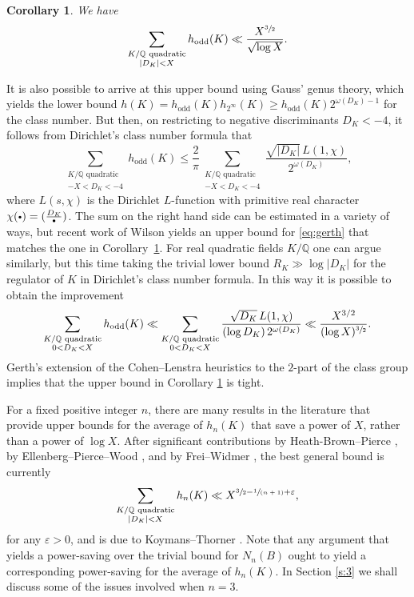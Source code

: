 \documentclass[JEP,XML,SOM,Unicode]{cedram}
\newcommand{\spfrac}[2]{\sfrac{#1}{(#2)}}
\newcommand{\cbullet}{{\raisebox{1pt}{$\scriptscriptstyle\bullet$}}}
\newcommand{\QQ}{\mathbb{Q}}\let\Q\QQ
\let\ve\varepsilon
\newtheorem{corollary}[theorem]{Corollary}
\begin{document}
\begin{corollary}\label{cor:1.2}
We have
\[
\sum_{
\substack{K/\QQ \textup{ quadratic}\\
|D_K|<X
}} h_\textup{odd}(K)\ll \frac{X^{\sfrac{3}{2}}}{\sqrt{\log X}}.
\]
\end{corollary}

It is also possible to arrive at this upper bound using Gauss' genus theory, which yields the lower bound
$h(K)=h_{\text{odd}}(K)h_{2^\infty}(K)\geq h_{\text{odd}}(K)2^{\omega(D_K)-1}$ for the class number.
But then, on restricting to negative discriminants $D_K<-4$, it follows from
Dirichlet's class number formula that
\begin{equation}\label{eq:gerth}
\sum_{
\substack{K/\QQ \text{ quadratic}\\
-X<D_K<-4
}} h_\text{odd}(K)\leq
\frac{2}{\pi}
\sum_{
\substack{K/\QQ \text{ quadratic}\\
-X<D_K<-4
}} \frac{\sqrt{|D_K|}\,L(1,\chi)}{2^{\omega(D_K)}},
\end{equation}
where
$L(s,\chi)$ is the Dirichlet $L$-function
with primitive real character $\chi(\cbullet)=(\frac{D_K}{\cbullet})$.
The sum on the right hand side can be estimated in a variety of ways, but recent work of Wilson \cite[Cor.\,1.6]{wilson} yields an upper bound for
\eqref{eq:gerth} that matches the one in Corollary~\ref{cor:1.2}.
For real quadratic fields $K/\QQ$ one can argue similarly, but this time taking the trivial lower bound $R_K\gg \log |D_K|$ for the regulator of $K$ in Dirichlet's class number formula.
In this way it is possible to obtain the improvement
\[
\sum_{
\substack{K/\QQ \text{ quadratic}\\
0<D_K<X
}} h_\text{odd}(K)
\ll
\sum_{
\substack{K/\QQ \text{ quadratic}\\
0<D_K<X
}} \frac{\sqrt{D_K}\,L(1,\chi)}{(\log D_K)\, 2^{\omega(D_K)}}
\ll\frac{X^{3/2}}{(\log X)^{\sfrac{3}{2}}}.
\]
Gerth's \cite{gerth1,gerth2} extension of the Cohen--Lenstra heuristics to the $2$-part of the class group implies that
the upper bound in
Corollary \ref{cor:1.2} is tight.

For a fixed positive integer $n$,
there are many results in the literature
that provide
upper bounds for the average of $h_n(K)$
that save a power of $X$, rather than a power of $\log X$.
After significant contributions by
Heath-Brown--Pierce \cite{hb-p}, by
Ellenberg--Pierce--Wood
\cite{pierce2}, and
by Frei--Widmer
\cite{frei},
the best general bound is
currently
\[
\sum_{
\substack{K/\QQ \text{ quadratic}\\
|D_K|<X
}} h_n(K)\ll X^{\sfrac{3}{2}
-\spfrac{1}{n+1}+\ve},
\]
for any $\ve>0$, and is
due to Koymans--Thorner \cite{koy}.
Note that any argument that yields a power-saving over the trivial
bound for $N_n(B)$
ought to yield a corresponding power-saving for the average of $h_n(K)$.
In Section \ref{s:3} we shall discuss some of the issues involved when
$n=3$.
\end{document}
